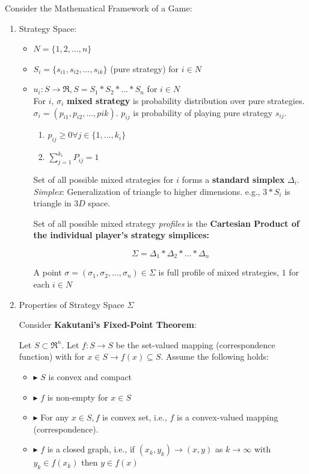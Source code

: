 \documentclass[../Main.tex]{subfiles}
\begin{document}
Consider the Mathematical Framework of a Game:
\begin{enumerate}
    \item Strategy Space:
    \begin{itemize}
        \item $N=\{1,2,...,n\}$
        \item $S_i = \{s_{i1},s_{i2},...,s_{ik}\}$ (pure strategy) for $i \in N$
        \item $u_i: S \rightarrow \Re, S = S_1 * S_2 * ... * S_n$ for $i \in N$\\
        
        For $i$, $\sigma_i$ \textbf{mixed strategy} is probability distribution over pure strategies. $\sigma_i = (p_{i1}, p_{i2},...,p{ik})$. $p_{ij}$ is probability of playing pure strategy $s_{ij}$.\\
        
        \begin{enumerate}
            \item $p_{ij} \geq 0 \forall j \in \{1,...,k_i\}$
            \item $\sum^{k_i}_{j=1} P_{ij} = 1$
        \end{enumerate}
        Set of all possible mixed strategies for $i$ forms a \textbf{standard simplex} $\Delta_i$. \textit{Simplex}: Generalization of triangle to higher dimensions. e.g., $3 * S_i$ is triangle in $3D$ space.

        Set of all possible mixed strategy \textit{profiles} is the \textbf{Cartesian Product of the individual player's strategy simplices:}
        \begin{center}
            \[
            \Sigma = \Delta_1 * \Delta_2*...*\Delta_n
            \]
        \end{center}
        A point $\sigma = (\sigma_1,\sigma_2,...,\sigma_n) \in \Sigma$ is full profile of mixed strategies, $1$ for each $i \in N$
    \end{itemize}
    
    \item Properties of Strategy Space $\Sigma$

    Consider \textbf{Kakutani's Fixed-Point Theorem}:

    Let $S \subset \Re^n$. Let $f: S \rightarrow S$ be the set-valued mapping (correspondence function) with for $x \in S \rightarrow f(x) \subseteq S$. Assume the following holds:
    \begin{itemize}
        \item$\blacktriangleright$ $S$ is convex and compact
        \item$\blacktriangleright$ $f$ is non-empty for $x \in S$
        \item$\blacktriangleright$ For any $x \in S, f$ is convex  set, i.e., $f$ is a convex-valued mapping (correspondence).
        \item$\blacktriangleright$ $f$ is a closed graph, i.e., if $(x_k,y_k) \rightarrow (x,y)$ as $k \rightarrow \infty$ with $y_k \in f(x_k)$ then $y \in f(x)$


\end{itemize}
\end{enumerate}
\end{document}
